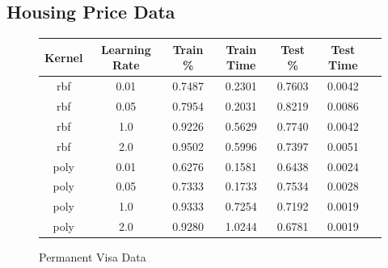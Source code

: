 \documentclass[h]{article}
\begin{document}
\subsection*{Housing Price Data}

\begin{figure}[H]
\begin{tabular}{ | c | c  | c | c | c | c | c |} 
\hline
\textbf{Kernel} & \textbf{Learning Rate} & \textbf{Train \%} & \textbf{Train Time} & \textbf{Test \%} & \textbf{Test Time}   \\ \hline
rbf & 0.01 & 0.7487 & 0.2301 & 0.7603 & 0.0042 \\ \hline
rbf & 0.05 & 0.7954 & 0.2031 & 0.8219 & 0.0086 \\ \hline
rbf & 1.0 & 0.9226 & 0.5629 & 0.7740 & 0.0042 \\ \hline
rbf & 2.0 & 0.9502 & 0.5996 & 0.7397 & 0.0051 \\ \hline
poly & 0.01 & 0.6276 & 0.1581 & 0.6438 & 0.0024 \\ \hline
poly & 0.05 & 0.7333 & 0.1733 & 0.7534 & 0.0028 \\ \hline
poly & 1.0 & 0.9333 & 0.7254 & 0.7192 & 0.0019 \\ \hline
poly & 2.0 & 0.9280 & 1.0244 & 0.6781 & 0.0019 \\ \hline


\hline
\end{tabular}
\caption*{Permanent Visa Data}
\endminipage\hfill
\end{figure}
\end{document}
